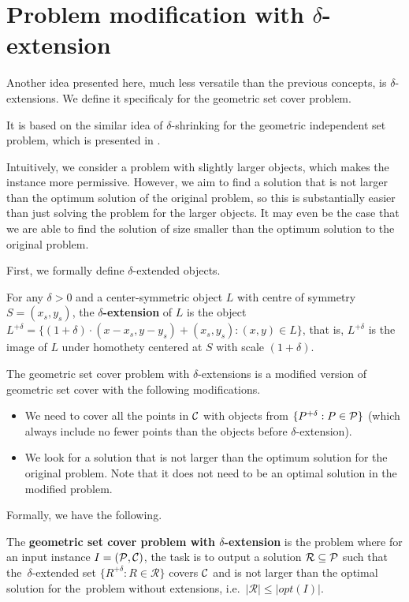 \section{Problem modification with $\delta$-extension}

Another idea presented here, much less versatile than the previous concepts,
is $\delta$-extensions.
We define it specificaly for the geometric set cover problem.

It is based on the similar idea of $\delta$-shrinking
for the geometric independent set problem,
which is presented in \cite{shrinking}.

Intuitively, we consider a problem with slightly larger objects,
which makes the instance more permissive.
However, we aim to find a solution that
is not larger than the
optimum solution of the original problem,
so this is substantially easier than just
solving the problem for the larger objects.
It may even be the case
that we are able to find the solution
of size smaller than the optimum solution
to the original problem.

First, we formally define $\delta$-extended objects.

\begin{defi}
For any $\delta > 0$ and a center-symmetric object $L$ with
centre of symmetry $S = (x_s, y_s)$,
the \textbf{$\delta$-extension} of $L$ is the object $L^{+\delta} =
\{(1 + \delta)\cdot(x - x_s, y - y_s) + (x_s, y_s) : (x, y) \in L\}$,
that is, $L^{+\delta}$ is the image of $L$ under homothety centered
at $S$ with scale $(1+\delta)$.
\end{defi}


The geometric set cover problem with $\delta$-extensions
is a modified version of geometric set cover with
the following modifications.
\begin{itemize}
\item We need to cover all the points in $\mathcal{C}$
with objects from $\{P^{+\delta} : P \in \mathcal{P}\}$ (which always 
include no fewer points than the objects
before $\delta$-extension).
\item We look for a solution that is not larger than the optimum solution
for the original problem.
Note that it does not need to be an optimal solution in
the modified problem.
\end{itemize}

Formally, we have the following.

\begin{defi}
The \textbf{geometric set cover problem
with $\delta$-extension} is the problem where for an input instance
$I=(\mathcal{P}, \mathcal{C})$,
the task is to output a solution $\mathcal{R} \subseteq \mathcal{P}$
such that the~$\delta$-extended set
$\{ R^{+\delta} :  R \in \mathcal{R} \}$ covers $\mathcal{C}$
and is not larger than the optimal solution for the~problem without
extensions, i.e.~$|\mathcal{R}| \le |opt(I)|$.
\end{defi}

